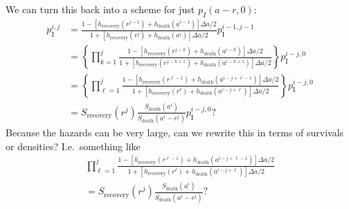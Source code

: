 \documentclass[12pt]{article}
\begin{document}
We can turn this back into a scheme for just $p_I(a - r, 0)$:
\begin{equation}
  \begin{split}
    p_{\text{I}}^{i, j}
    &= \frac{1 - \left[h_{\text{recovery}}(r^{j - 1})
        + h_{\text{death}}(a^{i - 1})\right] \Delta a / 2}
    {1 + \left[h_{\text{recovery}}(r^j)
        + h_{\text{death}}(a^i)\right] \Delta a / 2}
    p_{\text{I}}^{i - 1, j - 1}
    \\
    &= \left\{
      \prod_{k = 1}^j
      \frac{1 - \left[h_{\text{recovery}}(r^{j - k})
          + h_{\text{death}}(a^{i - k})\right] \Delta a / 2}
      {1 + \left[h_{\text{recovery}}(r^{j - k + 1})
          + h_{\text{death}}(a^{i - k + 1})\right] \Delta a / 2}
    \right\}
    p_{\text{I}}^{i - j, 0}
    \\
    &= \left\{
      \prod_{\ell = 1}^j
      \frac{1 - \left[h_{\text{recovery}}(r^{\ell - 1})
          + h_{\text{death}}(a^{i - j + \ell - 1})\right] \Delta a / 2}
      {1 + \left[h_{\text{recovery}}(r^{\ell})
          + h_{\text{death}}(a^{i - j + \ell})\right] \Delta a / 2}
    \right\}
    p_{\text{I}}^{i - j, 0}
    \\
    &= S_{\text{recovery}}(r^j)
    \frac{S_{\text{death}}(a^i)}{S_{\text{death}}(a^i - r^j)}
    p_{\text{I}}^{i - j, 0}?
  \end{split}
\end{equation}
Because the hazards can be very large, can we rewrite this in terms of
survivals or densities? I.e.~something like
\begin{equation}
  \begin{split}
    \prod_{\ell = 1}^j
    \frac{1 - \left[h_{\text{recovery}}(r^{\ell - 1})
        + h_{\text{death}}(a^{i - j + \ell - 1})\right] \Delta a / 2}
    {1 + \left[h_{\text{recovery}}(r^{\ell})
        + h_{\text{death}}(a^{i - j + \ell})\right] \Delta a / 2}
    \\
    = S_{\text{recovery}}(r^j)
    \frac{S_{\text{death}}(a^i)}{S_{\text{death}}(a^i - r^j)}?
  \end{split}
\end{equation}



\end{document}
